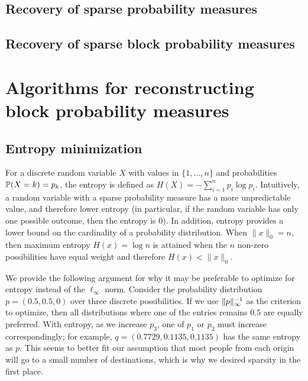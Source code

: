 \documentclass{article} %
\begin{document}
\subsection{Recovery of sparse probability measures}
\subsection{Recovery of sparse block probability measures}
\section{Algorithms for reconstructing block probability measures}
\subsection{Entropy minimization}
For a discrete random variable $X$ with values in $\{1, \dots, n\}$ and probabilities $\P(X = k) = p_k$, the entropy is defined as $H(X)  = -\sum_{i=1}^{n} p_i \log p_i$.
Intuitively, a random variable with a sparse probability measure has a more unpredictable value, and therefore lower entropy (in particular, if the random variable has only one possible outcome, then the entropy is 0).
In addition, entropy provides a lower bound on the cardinality of a probability distribution. When $\|x\|_0 = n$, then maximum entropy $H(x) = \log n$ is attained when the $n$ non-zero possibilities have equal weight and therefore $H(x) < \|x\|_0$.

We provide the following argument for why it may be preferable to optimize for entropy instead of the $\ell_\infty$ norm.
Consider the probability distribution $p = (0.5, 0.5, 0)$ over three discrete possibilities.
If we use $\norm{p}_{\infty}^{-1}$ as the criterion to optimize, then all distributions where one of the entries remains $0.5$ are equally preferred.
With entropy, as we increase $p_3$, one of $p_1$ or $p_2$ must increase correspondingly; for example, $q = (0.7729, 0.1135, 0.1135)$ has the same entropy as $p$.
This seems to better fit our assumption that most people from each origin will go to a small number of destinations, which is why we desired sparsity in the first place.
\end{document}
